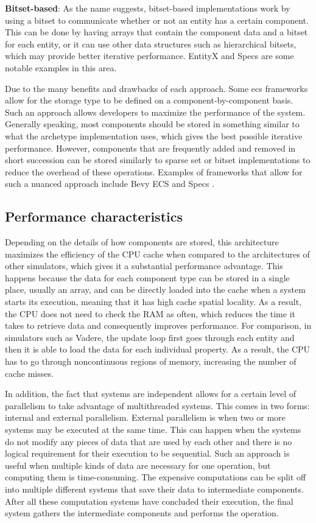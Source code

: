 \documentclass[twoside, 11pt]{article}
\begin{document}
\textbf{Bitset-based}: As the name suggests, bitset-based implementations work by using a bitset to communicate whether or not an entity has a certain component. This can be done by having arrays that contain the component data and a bitset for each entity, or it can use other data structures such as hierarchical bitsets, which may provide better iterative performance. EntityX \cite{entityx} and Specs \cite{specs} are some notable examples in this area.

Due to the many benefits and drawbacks of each approach. Some \gls{ecs} frameworks allow for the storage type to be defined on a component-by-component basis. Such an approach allows developers to maximize the performance of the system. Generally speaking, most components should be stored in something similar to what the archetype implementation uses, which gives the best possible iterative performance. However, components that are frequently added and removed in short succession can be stored similarly to sparse set or bitset implementations to reduce the overhead of these operations. Examples of frameworks that allow for such a nuanced approach include Bevy ECS \cite{bevy} and Specs \cite{specs}.

\subsection{Performance characteristics}

Depending on the details of how components are stored, this architecture maximizes the efficiency of the CPU cache when compared to the architectures of other simulators, which gives it a substantial performance advantage. This happens because the data for each component type can be stored in a single place, usually an array, and can be directly loaded into the cache when a system starts its execution, meaning that it has high cache spatial locality. As a result, the CPU does not need to check the RAM as often, which reduces the time it takes to retrieve data and consequently improves performance. For comparison, in simulators such as Vadere, the update loop first goes through each entity and then it is able to load the data for each individual property. As a result, the CPU has to go through noncontinuous regions of memory, increasing the number of cache misses.

In addition, the fact that systems are independent allows for a certain level of parallelism to take advantage of multithreaded systems. This comes in two forms: internal and external parallelism. External parallelism is when two or more systems may be executed at the same time. This can happen when the systems do not modify any pieces of data that are used by each other and there is no logical requirement for their execution to be sequential. Such an approach is useful when multiple kinds of data are necessary for one operation, but computing them is time-consuming. The expensive computations can be split off into multiple different systems that save their data to intermediate components. After all these computation systems have concluded their execution, the final system gathers the intermediate components and performs the operation. 
\end{document}
